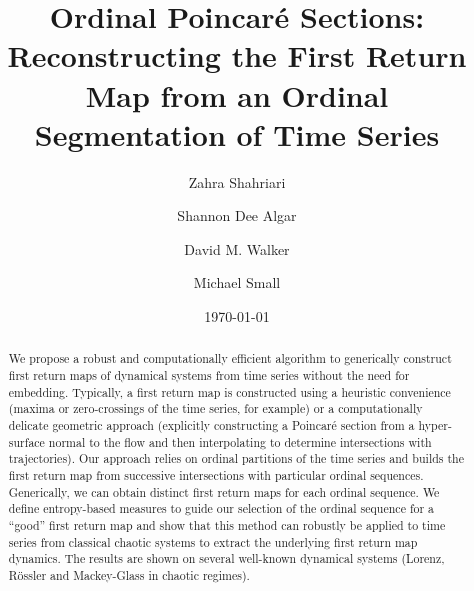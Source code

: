 \documentclass[%
 aip,
 amsmath,amssymb,
 reprint,%
]{revtex4-1}
\begin{document}

\title[Ordinal Poincar\'e Sections: Reconstructing the First Return Map from an Ordinal Segmentation of Time Series]{Ordinal Poincar\'e Sections: Reconstructing the First Return Map from an Ordinal Segmentation of Time Series}
\author{Zahra Shahriari}
\author{Shannon Dee Algar}%
\author{David M. Walker}%
\author{Michael Small}
%


\date{\today}%

\begin{abstract}
We propose a robust and computationally efficient algorithm to generically construct first return maps of dynamical systems from time series without the need for embedding. Typically, a first return map is constructed using a heuristic convenience (maxima or zero-crossings of the time series, for example) or a computationally delicate geometric approach (explicitly constructing a Poincar\'e section from a hyper-surface normal to the flow and then interpolating to determine intersections with trajectories). Our approach relies on ordinal partitions of the time series and builds the first return map from successive intersections with particular ordinal sequences. Generically, we can obtain distinct first return maps for each ordinal sequence. We define entropy-based measures to guide our selection of the ordinal sequence for a ``good'' first return map and show that this method can robustly be applied to time series from classical chaotic systems to extract the underlying first return map dynamics. The results are shown on several well-known dynamical systems (Lorenz, R{\"o}ssler and Mackey-Glass in chaotic regimes).

\end{abstract}
\end{document}
